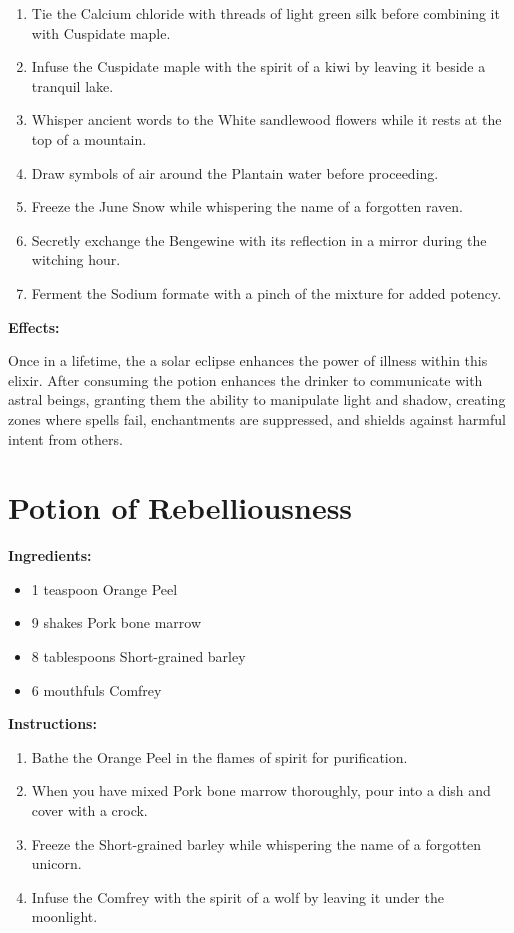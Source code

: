 \documentclass{article}
\begin{document}
\begin{enumerate}
  \item Tie the Calcium chloride with threads of light green silk before combining it with Cuspidate maple.
  \item Infuse the Cuspidate maple with the spirit of a kiwi by leaving it beside a tranquil lake.
  \item Whisper ancient words to the White sandlewood flowers while it rests at the top of a mountain.
  \item Draw symbols of air around the Plantain water before proceeding.
  \item Freeze the June Snow while whispering the name of a forgotten raven.
  \item Secretly exchange the Bengewine with its reflection in a mirror during the witching hour.
  \item Ferment the Sodium formate with a pinch of the mixture for added potency.
\end{enumerate}

\textbf{Effects:}

Once in a lifetime, the a solar eclipse enhances the power of illness within this elixir. After consuming the potion enhances the drinker to communicate with astral beings, granting them the ability to manipulate light and shadow, creating zones where spells fail, enchantments are suppressed, and shields against harmful intent from others.

\newpage
\section*{Potion of Rebelliousness}

\textbf{Ingredients:}

\begin{itemize}
  \item 1 teaspoon Orange Peel
  \item 9 shakes Pork bone marrow
  \item 8 tablespoons Short-grained barley
  \item 6 mouthfuls Comfrey
\end{itemize}

\textbf{Instructions:}

\begin{enumerate}
  \item Bathe the Orange Peel in the flames of spirit for purification.
  \item When you have mixed Pork bone marrow thoroughly, pour into a dish and cover with a crock.
  \item Freeze the Short-grained barley while whispering the name of a forgotten unicorn.
  \item Infuse the Comfrey with the spirit of a wolf by leaving it under the moonlight.
\end{enumerate}
\end{document}
